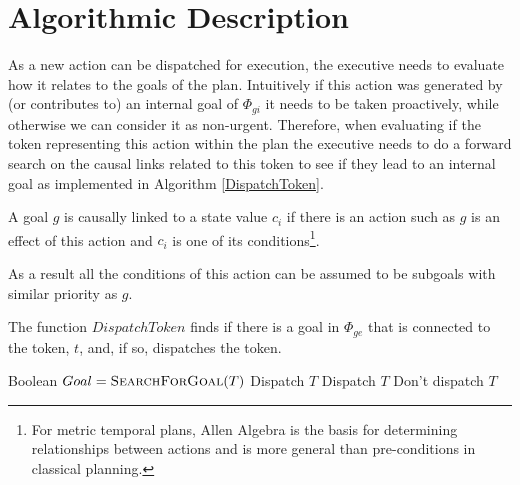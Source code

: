 \section{Algorithmic Description}

As a new action can be dispatched for execution, the executive needs
to evaluate how it relates to the goals of the plan. Intuitively if
this action was generated by (or contributes to) an internal goal of
$\Phi_{gi}$ it needs to be taken proactively, while otherwise we can
consider it as non-urgent. Therefore, when evaluating if the token
representing this action within the plan the executive needs to do a
forward search on the causal links related to this token to see if
they lead to an internal goal as implemented in Algorithm
\ref{DispatchToken}.

\begin{definition}
\label{def:subgoalLink}
A goal $g$ is causally linked to a state value $c_i$ if there is an
action such as $g$ is an effect of this action and $c_i$ is one of its
conditions\footnote{For metric temporal plans, Allen Algebra
  \cite{allen84} is the basis for determining relationships between
  actions and is more general than pre-conditions in classical
  planning.}. 
\end{definition}

As a result all the conditions of this action can be assumed to be
subgoals with similar priority as $g$.

\begin{algorithm} [H]
  \caption{\small The function $DispatchToken$ finds if there is a
    goal in $\Phi_{ge}$ that is connected to the token, $t$, and, if
    so, dispatches the token.}
\label{DispatchToken}
\begin{algorithmic}
\small 
{}
\State Boolean $Goal = \textsc{SearchForGoal}( T )$
	\State \Return Dispatch $T$
	\State \Return Dispatch $T$
\Else
	\State \Return Don't dispatch $T$
\EndIf
\EndFunction
\end{algorithmic}
\end{algorithm}

